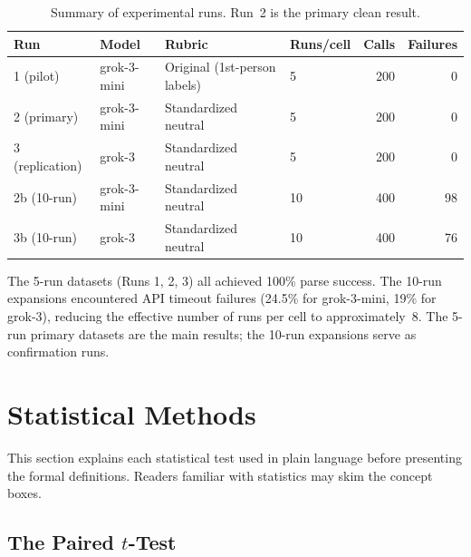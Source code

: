 \documentclass[12pt, letterpaper]{article}
\begin{document}
\begin{table}[h]
\centering
\caption{Summary of experimental runs. Run~2 is the primary clean result.}
\label{tab:runs}
\begin{tabular}{llllrr}
\toprule
\textbf{Run} & \textbf{Model} & \textbf{Rubric} & \textbf{Runs/cell} & \textbf{Calls} & \textbf{Failures} \\
\midrule
1 (pilot)       & grok-3-mini & Original (1st-person labels) & 5  & 200 & 0 \\
2 (primary)     & grok-3-mini & Standardized neutral         & 5  & 200 & 0 \\
3 (replication) & grok-3      & Standardized neutral         & 5  & 200 & 0 \\
2b (10-run)     & grok-3-mini & Standardized neutral         & 10 & 400 & 98 \\
3b (10-run)     & grok-3      & Standardized neutral         & 10 & 400 & 76 \\
\bottomrule
\end{tabular}
\end{table}

The 5-run datasets (Runs 1, 2, 3) all achieved 100\% parse success. The 10-run
expansions encountered API timeout failures (24.5\% for grok-3-mini, 19\% for grok-3),
reducing the effective number of runs per cell to approximately~8. The 5-run primary
datasets are the main results; the 10-run expansions serve as confirmation runs.

\section{Statistical Methods}
\label{sec:stats}

This section explains each statistical test used in plain language before presenting
the formal definitions. Readers familiar with statistics may skim the concept boxes.

\subsection{The Paired \texorpdfstring{$t$}{t}-Test}
\end{document}
